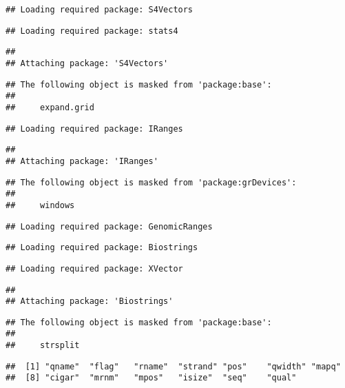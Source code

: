 \documentclass[]{article}
\begin{document}
\begin{verbatim}
## Loading required package: S4Vectors
\end{verbatim}

\begin{verbatim}
## Loading required package: stats4
\end{verbatim}

\begin{verbatim}
## 
## Attaching package: 'S4Vectors'
\end{verbatim}

\begin{verbatim}
## The following object is masked from 'package:base':
## 
##     expand.grid
\end{verbatim}

\begin{verbatim}
## Loading required package: IRanges
\end{verbatim}

\begin{verbatim}
## 
## Attaching package: 'IRanges'
\end{verbatim}

\begin{verbatim}
## The following object is masked from 'package:grDevices':
## 
##     windows
\end{verbatim}

\begin{verbatim}
## Loading required package: GenomicRanges
\end{verbatim}

\begin{verbatim}
## Loading required package: Biostrings
\end{verbatim}

\begin{verbatim}
## Loading required package: XVector
\end{verbatim}

\begin{verbatim}
## 
## Attaching package: 'Biostrings'
\end{verbatim}

\begin{verbatim}
## The following object is masked from 'package:base':
## 
##     strsplit
\end{verbatim}

\begin{verbatim}
##  [1] "qname"  "flag"   "rname"  "strand" "pos"    "qwidth" "mapq"  
##  [8] "cigar"  "mrnm"   "mpos"   "isize"  "seq"    "qual"
\end{verbatim}
\end{document}
